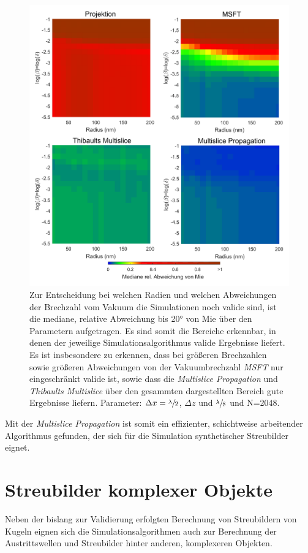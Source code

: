 \begin{figure} %
	\centering
	\includegraphics[width=1\textwidth]{images/fig_sim_var.pdf}
	\caption[Gültigkeit der Simulationsalgorithmen]{Zur Entscheidung bei welchen Radien und welchen Abweichungen der Brechzahl vom Vakuum die Simulationen noch valide sind, ist die mediane, relative Abweichung bis 20° von Mie über den Parametern aufgetragen. Es sind somit die Bereiche erkennbar, in denen der jeweilige Simulationsalgorithmus valide Ergebnisse liefert. Es ist insbesondere zu erkennen, dass bei größeren Brechzahlen sowie größeren Abweichungen von der Vakuumbrechzahl \textit{MSFT} nur eingeschränkt valide ist, sowie dass die \textit{Multislice Propagation} und \textit{Thibaults Multislice} über den gesammten dargestellten Bereich gute Ergebnisse liefern. Parameter: $\Delta x=\sfrac{\lambda}{2}$, $\Delta z$ und $\sfrac{\lambda}{8}$ und N=2048.}
	\label{fig:variation}
\end{figure}

Mit der \textit{Multislice Propagation} ist somit ein effizienter, schichtweise arbeitender Algorithmus gefunden, der sich für die Simulation synthetischer Streubilder eignet.


\section{Streubilder komplexer Objekte}
Neben der bislang zur Validierung erfolgten Berechnung von Streubildern von Kugeln eignen sich die Simulationsalgorithmen auch zur Berechnung der Austrittswellen und Streubilder hinter anderen, komplexeren Objekten.

